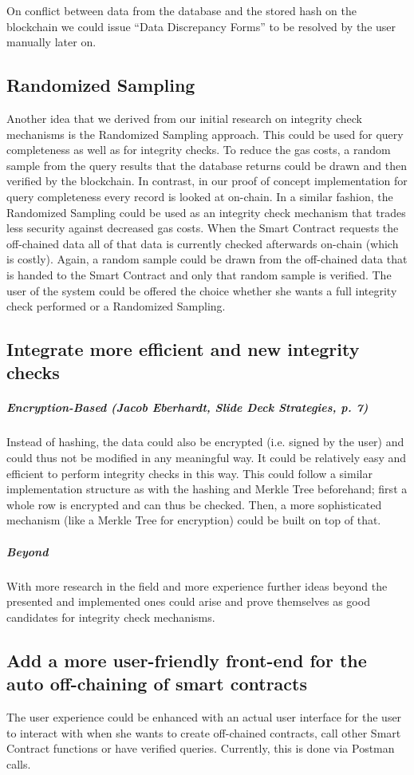 On conflict between data from the database and the stored hash on the blockchain we could issue “Data Discrepancy Forms” to be resolved by the user manually later on.

\subsection{Randomized Sampling}
Another idea that we derived from our initial research on integrity check mechanisms is the Randomized Sampling approach. This could be used for query completeness as well as for integrity checks.
To reduce the gas costs, a random sample from the query results that the database returns could be drawn and then verified by the blockchain. In contrast, in our proof of concept implementation for query completeness every record is looked at on-chain.
In a similar fashion, the Randomized Sampling could be used as an integrity check mechanism that trades less security against decreased gas costs. When the Smart Contract requests the off-chained data all of that data is currently checked afterwards on-chain (which is costly). Again, a random sample could be drawn from the off-chained data that is handed to the Smart Contract and only that random sample is verified. The user of the system could be offered the choice whether she wants a full integrity check performed or a Randomized Sampling.

\subsection{Integrate more efficient and new integrity checks}
\subparagraph{Encryption-Based (Jacob Eberhardt, Slide Deck Strategies, p. 7)}
Instead of hashing, the data could also be encrypted (i.e. signed by the user) and could thus not be modified in any meaningful way. It could be relatively easy and efficient to perform integrity checks in this way.
This could follow a similar implementation structure as with the hashing and Merkle Tree beforehand; first a whole row is encrypted and can thus be checked. Then, a more sophisticated mechanism (like a Merkle Tree for encryption) could be built on top of that.

\subparagraph{Beyond}
With more research in the field and more experience further ideas beyond the presented and implemented ones could arise and prove themselves as good candidates for integrity check mechanisms.

\subsection{Add a more user-friendly front-end for the auto off-chaining of smart contracts}
The user experience could be enhanced with an actual user interface for the user to interact with when she wants to create off-chained contracts, call other Smart Contract functions or have verified queries. Currently, this is done via Postman calls.

